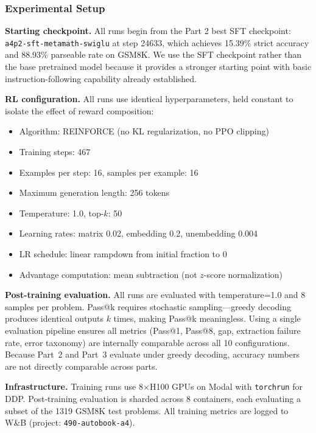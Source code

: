 \subsubsection{Experimental Setup}
\nestindent

\textbf{Starting checkpoint.}
All runs begin from the Part 2 best SFT checkpoint: \texttt{a4p2-sft-metamath-swiglu} at step 24633, which achieves 15.39\% strict accuracy and 88.93\% parseable rate on GSM8K.
We use the SFT checkpoint rather than the base pretrained model because it provides a stronger starting point with basic instruction-following capability already established.

\textbf{RL configuration.}
All runs use identical hyperparameters, held constant to isolate the effect of reward composition:

\begin{itemize}[nosep]
    \item Algorithm: REINFORCE (no KL regularization, no PPO clipping)
    \item Training steps: 467
    \item Examples per step: 16, samples per example: 16
    \item Maximum generation length: 256 tokens
    \item Temperature: 1.0, top-$k$: 50
    \item Learning rates: matrix 0.02, embedding 0.2, unembedding 0.004
    \item LR schedule: linear rampdown from initial fraction to 0
    \item Advantage computation: mean subtraction (not $z$-score normalization)
\end{itemize}

\textbf{Post-training evaluation.}
All runs are evaluated with temperature=1.0 and 8 samples per problem.
Pass@k requires stochastic sampling---greedy decoding produces identical outputs $k$ times, making Pass@k meaningless.
Using a single evaluation pipeline ensures all metrics (Pass@1, Pass@8, gap, extraction failure rate, error taxonomy) are internally comparable across all 10 configurations.
Because Part~2 and Part~3 evaluate under greedy decoding, accuracy numbers are not directly comparable across parts.

\textbf{Infrastructure.}
Training runs use 8$\times$H100 GPUs on Modal with \texttt{torchrun} for DDP.
Post-training evaluation is sharded across 8 containers, each evaluating a subset of the 1319 GSM8K test problems.
All training metrics are logged to W\&B (project: \texttt{490-autobook-a4}).
\nestunindent
